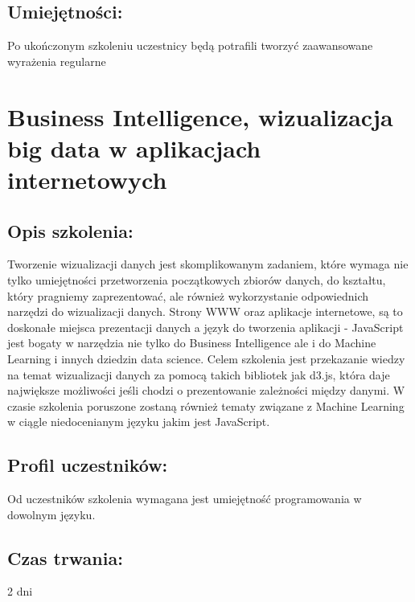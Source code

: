 \documentclass{article}[10pt]
\begin{document}
	\subsection*{Umiejętności:}
\begin{adjustwidth}{2cm}{}
\justifying
	
Po ukończonym szkoleniu uczestnicy będą potrafili tworzyć zaawansowane wyrażenia regularne
\end{adjustwidth}

\newpage


    
	\section{Business Intelligence, wizualizacja big data w aplikacjach internetowych}

	\subsection*{Opis szkolenia:}
	\begin{adjustwidth}{2cm}{}
\justifying
		Tworzenie wizualizacji danych jest skomplikowanym zadaniem, które wymaga nie tylko umiejętności przetworzenia początkowych zbiorów danych, do kształtu, który pragniemy zaprezentować, ale również wykorzystanie odpowiednich narzędzi do wizualizacji danych.
Strony WWW oraz aplikacje internetowe, są to doskonałe miejsca prezentacji danych a język do tworzenia aplikacji - JavaScript jest bogaty w narzędzia nie tylko do Business Intelligence ale i do Machine Learning i innych dziedzin data science.
Celem szkolenia jest przekazanie wiedzy na temat wizualizacji danych za pomocą takich bibliotek jak d3.js, która daje największe możliwości jeśli chodzi o prezentowanie zależności między danymi. W czasie szkolenia poruszone zostaną również tematy związane z Machine Learning w ciągle niedocenianym języku jakim jest JavaScript.


	\end{adjustwidth}
	\subsection*{Profil uczestników:}
\begin{adjustwidth}{2cm}{}
\justifying
	
Od uczestników szkolenia wymagana jest umiejętność programowania w dowolnym języku.

\end{adjustwidth}
	\subsection*{Czas trwania:}
\begin{adjustwidth}{2cm}{}
	2 dni
\end{adjustwidth}
\end{document}
